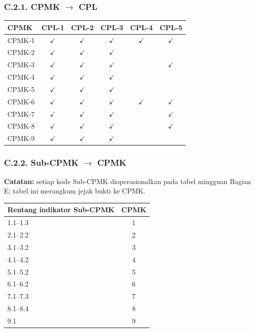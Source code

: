 \documentclass[12pt,a4paper]{article}
\begin{document}
\subsubsection*{C.2.1. CPMK $\rightarrow$ CPL}

{\small
\begin{tabular}{|l|c|c|c|c|c|}
\hline
\textbf{CPMK} & \textbf{CPL-1} & \textbf{CPL-2} & \textbf{CPL-3} & \textbf{CPL-4} & \textbf{CPL-5} \\
\hline
CPMK-1 & $\checkmark$ & $\checkmark$ & $\checkmark$ & $\checkmark$ & $\checkmark$ \\
CPMK-2 & $\checkmark$ & $\checkmark$ & $\checkmark$ & & \\
CPMK-3 & $\checkmark$ & $\checkmark$ & $\checkmark$ & & $\checkmark$ \\
CPMK-4 & $\checkmark$ & $\checkmark$ & $\checkmark$ & & \\
CPMK-5 & $\checkmark$ & $\checkmark$ & $\checkmark$ & & \\
CPMK-6 & $\checkmark$ & $\checkmark$ & $\checkmark$ & $\checkmark$ & $\checkmark$ \\
CPMK-7 & $\checkmark$ & $\checkmark$ & $\checkmark$ & & $\checkmark$ \\
CPMK-8 & $\checkmark$ & $\checkmark$ & $\checkmark$ & & $\checkmark$ \\
CPMK-9 & $\checkmark$ & $\checkmark$ & $\checkmark$ & & \\
\hline
\end{tabular}
}

\subsubsection*{C.2.2. Sub-CPMK $\rightarrow$ CPMK}

{\small
\noindent\textbf{Catatan:} setiap kode Sub-CPMK dioperasionalkan pada tabel mingguan Bagian E; tabel ini merangkum jejak bukti ke CPMK.

\begin{tabular}{|p{10.2cm}|c|}
\hline
\textbf{Rentang indikator Sub-CPMK} & \textbf{CPMK} \\
\hline
1.1--1.3 & 1 \\
\hline
2.1--2.2 & 2 \\
\hline
3.1--3.2 & 3 \\
\hline
4.1--4.2 & 4 \\
\hline
5.1--5.2 & 5 \\
\hline
6.1--6.2 & 6 \\
\hline
7.1--7.3 & 7 \\
\hline
8.1--8.4 & 8 \\
\hline
9.1 & 9 \\
\hline
\end{tabular}
}
\end{document}
